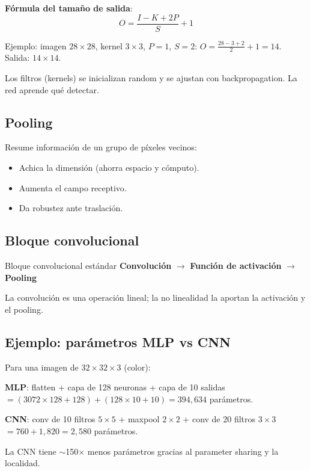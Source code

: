 \documentclass[12pt, a4paper]{article}
\begin{document}
\textbf{Fórmula del tamaño de salida}:
\[
	O = \frac{I - K + 2P}{S} + 1
\]

Ejemplo: imagen $28 \times 28$, kernel $3 \times 3$, $P=1$, $S=2$: $O = \frac{28-3+2}{2}+1 = 14$. Salida: $14 \times 14$.

Los filtros (kernels) se inicializan random y se ajustan con backpropagation. La red aprende qué detectar.

\subsection{Pooling}

Resume información de un grupo de píxeles vecinos:
\begin{itemize}
	\item Achica la dimensión (ahorra espacio y cómputo).
	\item Aumenta el campo receptivo.
	\item Da robustez ante traslación.
\end{itemize}

\subsection{Bloque convolucional}

\begin{algbox}{Bloque convolucional estándar}
	\textbf{Convolución} $\longrightarrow$ \textbf{Función de activación} $\longrightarrow$ \textbf{Pooling}

	La convolución es una operación lineal; la no linealidad la aportan la activación y el pooling.
\end{algbox}

\subsection{Ejemplo: parámetros MLP vs CNN}

Para una imagen de $32 \times 32 \times 3$ (color):

\textbf{MLP}: flatten + capa de 128 neuronas + capa de 10 salidas $= (3072 \times 128 + 128) + (128 \times 10 + 10) = 394{,}634$ parámetros.

\textbf{CNN}: conv de 10 filtros $5 \times 5$ + maxpool $2 \times 2$ + conv de 20 filtros $3 \times 3$ $= 760 + 1{,}820 = 2{,}580$ parámetros.

La CNN tiene $\sim$150$\times$ menos parámetros gracias al parameter sharing y la localidad.

\end{document}
